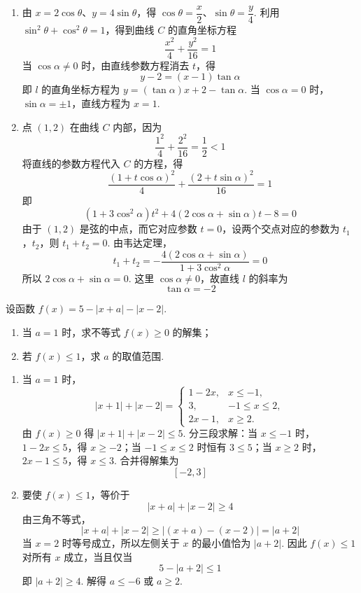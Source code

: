 \begin{solution}
\begin{enumerate}
\item 由 \(x=2\cos\theta\)、\(y=4\sin\theta\)，得
\(\cos\theta=\dfrac x2\)、\(\sin\theta=\dfrac y4\). 利用
\(\sin^2\theta+\cos^2\theta=1\)，得到曲线 \(C\) 的直角坐标方程
\[
\frac{x^2}{4}+\frac{y^2}{16}=1
\]
当 \(\cos\alpha\ne0\) 时，由直线参数方程消去 \(t\)，得
\[
y-2=(x-1)\tan\alpha
\]
即 \(l\) 的直角坐标方程为
\(y=(\tan\alpha)x+2-\tan\alpha\). 当 \(\cos\alpha=0\) 时，\(\sin\alpha=\pm1\)，直线方程为 \(x=1\).
\item 点 \((1,2)\) 在曲线 \(C\) 内部，因为
\[
\frac{1^2}{4}+\frac{2^2}{16}=\frac12<1
\]
将直线的参数方程代入 \(C\) 的方程，得
\[
\frac{(1+t\cos\alpha)^2}{4}+\frac{(2+t\sin\alpha)^2}{16}=1
\]
即
\[
(1+3\cos^2\alpha)t^2+4(2\cos\alpha+\sin\alpha)t-8=0
\]
由于 \((1,2)\) 是弦的中点，而它对应参数 \(t=0\)，设两个交点对应的参数为 \(t_1\)，\(t_2\)，则
\(t_1+t_2=0\). 由韦达定理，
\[
t_1+t_2=-\frac{4(2\cos\alpha+\sin\alpha)}{1+3\cos^2\alpha}=0
\]
所以 \(2\cos\alpha+\sin\alpha=0\). 这里 \(\cos\alpha\ne0\)，故直线 \(l\) 的斜率为
\[
\tan\alpha=-2
\]
\end{enumerate}
\end{solution}

\begin{problem}
设函数 \(f(x)=5-|x+a|-|x-2|\).

\begin{enumerate}
\item 当 \(a=1\) 时，求不等式 \(f(x)\ge0\) 的解集；
\item 若 \(f(x)\le1\)，求 \(a\) 的取值范围.
\end{enumerate}
\end{problem}

\begin{solution}
\begin{enumerate}
\item 当 \(a=1\) 时，
\[
|x+1|+|x-2|=
\begin{cases}
1-2x,&x\le-1,\\
3,&-1\le x\le2,\\
2x-1,&x\ge2.
\end{cases}
\]
由 \(f(x)\ge0\) 得 \(|x+1|+|x-2|\le5\). 分三段求解：当 \(x\le-1\) 时，\(1-2x\le5\)，得 \(x\ge-2\)；当 \(-1\le x\le2\) 时恒有 \(3\le5\)；当 \(x\ge2\) 时，\(2x-1\le5\)，得 \(x\le3\). 合并得解集为
\[
[-2,3]
\]
\item 要使 \(f(x)\le1\)，等价于
\[
|x+a|+|x-2|\ge4
\]
由三角不等式，
\[
|x+a|+|x-2|\ge|(x+a)-(x-2)|=|a+2|
\]
当 \(x=2\) 时等号成立，所以左侧关于 \(x\) 的最小值恰为 \(|a+2|\). 因此
\(f(x)\le1\) 对所有 \(x\) 成立，当且仅当
\[
5-|a+2|\le1
\]
即 \(|a+2|\ge4\). 解得 \(a\le-6\) 或 \(a\ge2\).
\end{enumerate}
\end{solution}
